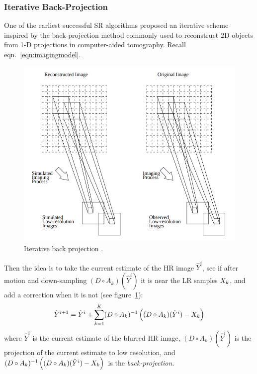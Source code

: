 \subsubsection{Iterative Back-Projection}\label{subsubsec:iterback}
One of the earliest successful SR algorithms \cite{Irani1991ImprovingRB} proposed an iterative scheme inspired by the back-projection method commonly used to reconstruct 2D objects from 1-D projections in computer-aided tomography.
%
Recall eqn.~\eqref{eqn:imagingmodel}.
\begin{figure}
    \centering
    \includegraphics[width=\linewidth,keepaspectratio]{figures/classical/iterative_back_projection.png}
    \caption{Iterative back projection \cite{Irani1991ImprovingRB}.}
    \label{fig:iterbackproj}
\end{figure}
%
Then the idea is to take the current estimate of the HR image \(\hat{Y}^{i}\), see if after motion and down-sampling \((D \circ A_k)(\hat{Y}^i)\) it is near the LR samples \(X_k\), and add a correction when it is not (see figure~\ref{fig:iterbackproj}):
\begin{equation}
    \hat{Y}^{i+1} = \hat{Y}^i + \sum_{k=1}^K (D \circ A_k)^{-1}\left( (D \circ A_k)(\hat{Y}^i) - X_k \right)
    \label{eqn:ibp}
\end{equation}
where \(\hat{Y}^i\) is the current estimate of the blurred HR image, \((D \circ A_k)(\hat{Y}^i)\) is the projection of the current estimate to low resolution, and \((D \circ A_k)^{-1}\left( (D \circ A_k)(\hat{Y}^i) - X_k \right)\) is the \textit{back-projection}.

